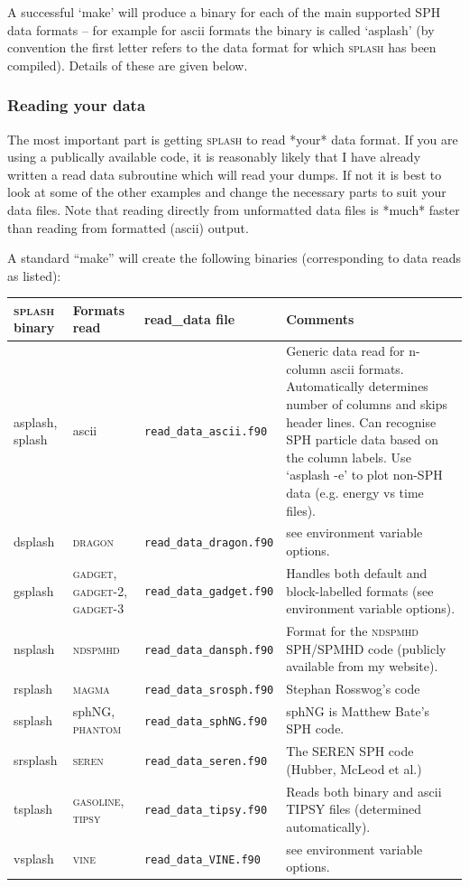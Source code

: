 \documentclass[a4paper,10pt]{article}
\newcommand{\splash}{\textsc{splash }}
\begin{document}
A successful `make' will produce a binary for each of the main supported SPH data formats -- for example for ascii formats the binary is called `asplash' (by convention the first letter refers to the data format for which \splash has been compiled). Details of these are given below.

\subsubsection{ Reading your data}
 The most important part is getting \splash to read *your* data format.
If you are using a publically available code, it is reasonably likely that I
have already written a read data subroutine which will read your dumps.
If not it is best to look at some of the other examples and change the 
necessary parts to suit your data files. Note that reading directly from
unformatted data files is *much* faster than reading from formatted (ascii)
output.   

A standard ``make'' will create the following binaries (corresponding to data reads as listed):

\begin{table}[h!]
\begin{tabular}{lp{}lp{}}
\splash binary & Formats read & read\_data file & Comments \\
\hline
asplash, splash & ascii & \verb+read_data_ascii.f90+ & Generic data read for n-column ascii formats. Automatically determines number of columns and skips header lines. Can recognise SPH particle data based on the column labels. Use `asplash -e' to plot non-SPH data (e.g. energy vs time files).\\
dsplash & \textsc{dragon} & \verb+read_data_dragon.f90+ & see environment variable options. \\
gsplash & \textsc{gadget},  \textsc{gadget-2},  \textsc{gadget-3} &  \verb+read_data_gadget.f90+ & Handles both default and block-labelled formats (see environment variable options). \\
nsplash & \textsc{ndspmhd} & \verb+read_data_dansph.f90+ & Format for the \textsc{ndspmhd} SPH/SPMHD code (publicly available from my website). \\
rsplash & \textsc{magma} & \verb+read_data_srosph.f90+  & Stephan Rosswog's code \\
ssplash & sphNG, \textsc{phantom} & \verb+read_data_sphNG.f90+ & sphNG is Matthew Bate's SPH code. \\
srsplash & \textsc{seren} & \verb+read_data_seren.f90+ & The \textsc{SEREN} SPH code (Hubber, McLeod et al.) \\
tsplash & \textsc{gasoline}, \textsc{tipsy}  &  \verb+read_data_tipsy.f90+ & Reads both binary and ascii TIPSY files (determined automatically). \\
vsplash & \textsc{vine} & \verb+read_data_VINE.f90+ & see environment variable options. \\
\hline
\end{tabular} 
\end{table}
\end{document}

